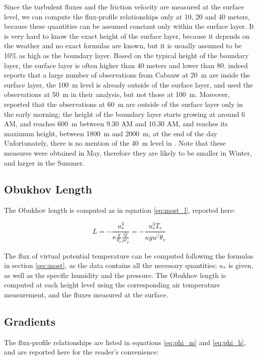 \documentclass[a4paper]{book}
\begin{document}
Since the turbulent fluxes and the friction velocity are measured at the surface level, we can compute the flux-profile relationships only at 10, 20 and 40 meters, because these quantities can be assumed constant only within the surface layer. It is very hard to know the exact height of the surface layer, because it depends on the weather and no exact formulas are known, but it is usually assumed to be 10\% as high as the boundary layer. Based on the typical height of the boundary layer, the surface layer is often higher than 40 meters and lower than 80. \cite{cabauw_z0} indeed reports that a large number of observations from Cabauw at \SI{20}{\meter} are inside the surface layer, the \SI{100}{\meter} level is already outside of the surface layer, and \cite{boulder} used the observations at \SI{50}{\meter} in their analysis, but not those at \SI{100}{\meter}. Moreover, \cite{cabauw60m} reported that the observations at \SI{60}{\meter} are outside of the surface layer only in the early morning; the height of the boundary layer starts growing at around 6 AM, and reaches \SI{600}{\meter} between 9.30 AM and 10.30 AM, and reaches its maximum height, between \SI{1800}{\meter} and \SI{2000}{\meter}, at the end of the day Unfortunately, there is no mention of the \SI{40}{\meter} level in \cite{cabauw60m}. Note that these measures were obtained in May, therefore they are likely to be smaller in Winter, and larger in the Summer.

\subsection{Obukhov Length}

The Obukhov length is computed as in equation \ref{eq:most_l}, reported here:

$$
L=-\frac{u_*^3}{\kappa\frac{g}{\theta_v}\frac{Q}{\rho c_\rho}}
=-\frac{u_*^3 T_v}{\kappa g \overline{w'\theta_v}}
$$

The flux of virtual potential temperature can be computed following the formulas in section \ref{sec:most}, as the data contains all the necessary quantities; $u_*$ is given, as well as the specific humidity and the pressure. The Obukhov length is computed at each height level using the corresponding air temperature measurement, and the fluxes measured at the surface.


\subsection{Gradients}
\label{sec:gradients}
The flux-profile relationships are listed in equations \ref{eq:phi_m} and \ref{eq:phi_h}, and are reported here for the reader's convenience:
\end{document}
